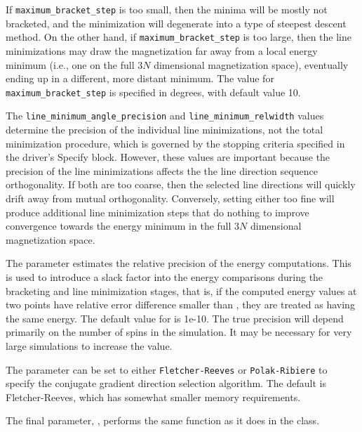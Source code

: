 \begin{description}
If \texttt{maximum\_bracket\_step} is too small, then the minima will be
mostly not bracketed, and the minimization will degenerate into a type
of steepest descent method.  On the other hand, if
\texttt{maximum\_bracket\_step} is too large, then the line
minimizations may draw the magnetization far away from a local energy
minimum (i.e., one on the full $3N$ dimensional magnetization space),
eventually ending up in a different, more distant minimum.  The value
for \texttt{maximum\_bracket\_step} is specified in degrees, with
default value 10.

The \texttt{line\_minimum\_angle\_precision} and
\texttt{line\_minimum\_relwidth} values determine the precision of the
individual line minimizations, not the total minimization procedure,
which is governed by the stopping criteria specified in the driver's
Specify block.  However, these values are important because the
precision of the line minimizations affects the the line direction
sequence orthogonality.  If both are too coarse, then the selected line
directions will quickly drift away from mutual orthogonality.
Conversely, setting either too fine will
produce additional line minimization steps that do nothing to improve
convergence towards the energy minimum in the full $3N$ dimensional
magnetization space.

The  parameter estimates the relative
precision of the energy computations.  This is used to introduce a slack
factor into the energy comparisons during the bracketing and line
minimization stages, that is, if the computed energy values at two
points have relative error difference smaller than
, they are treated as having the same energy.  The
default value for  is 1e-10.  The true precision
will depend primarily on the number of spins in the simulation.  It may
be necessary for very large simulations to increase the
 value.

The  parameter can be set to either
\texttt{Fletcher-Reeves} or \texttt{Polak-Ribiere} to specify the
conjugate gradient direction selection algorithm.  The default is
Fletcher-Reeves, which has somewhat smaller memory requirements.

The final parameter, , performs the same function
as it does in the 
class.


\end{description}
